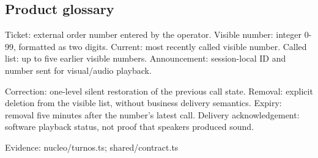 \subsection{Product glossary}

Ticket: external order number entered by the operator. Visible number: integer 0-99, formatted as two digits. Current: most recently called visible number. Called list: up to five earlier visible numbers. Announcement: session-local ID and number sent for visual/audio playback.

Correction: one-level silent restoration of the previous call state. Removal: explicit deletion from the visible list, without business delivery semantics. Expiry: removal five minutes after the number's latest call. Delivery acknowledgement: software playback status, not proof that speakers produced sound.

Evidence: nucleo/turnos.ts; shared/contract.ts
